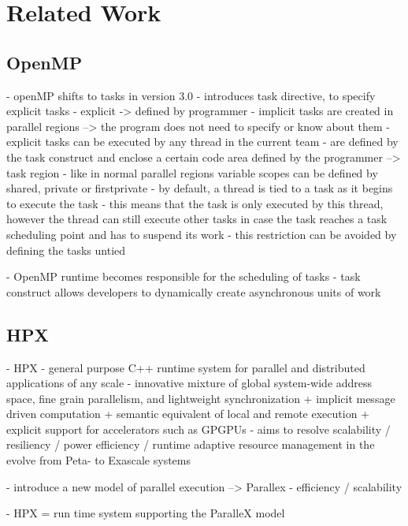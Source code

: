 \section{Related Work}
\subsection{OpenMP}


\cite{Ayguade.2009}
  - openMP shifts to tasks in version 3.0
  - introduces task directive, to specify explicit tasks
  	- explicit -> defined by programmer
    - implicit tasks are created in parallel regions \cite{MKlemm.2018}
    --> the program does not need to specify or know about them
  - explicit tasks can be executed by any thread in the current team
  - are defined by the task construct and enclose a certain code area defined by the programmer --> task region
  - like in normal parallel regions variable scopes can be defined by shared, private or firstprivate
  - by default, a thread is tied to a task as it begins to execute the task
    - this means that the task is only executed by this thread, however the thread can still execute other tasks in case the task reaches a task scheduling point and has to suspend its work
    - this restriction can be avoided by defining the tasks untied
    
\cite{Qawasmeh.2014}
  - OpenMP runtime becomes responsible for the scheduling of tasks
  - task construct allows developers to dynamically create asynchronous units of work


\subsection{HPX}
- HPX
  \cite{Kaiser.2014}
  - general purpose C++ runtime system for parallel and distributed applications of any scale
  - innovative mixture of global system-wide address space, fine grain parallelism, and lightweight synchronization
    + implicit message driven computation
    + semantic equivalent of local and remote execution
    + explicit support for accelerators such as GPGPUs
  - aims to resolve scalability / resiliency / power efficiency / runtime adaptive resource management in the evolve from Peta- to Exascale systems
  
\cite{Kaiser.2009}
  - introduce a new model of parallel execution --> Parallex
    - efficiency / scalability
    
  - HPX = run time system supporting the ParalleX model
  
